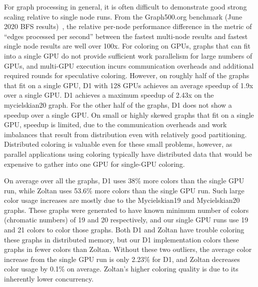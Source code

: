 For graph processing in general, it is often difficult to demonstrate good strong scaling relative to single node runs. From the Graph500.org benchmark (June 2020 BFS results)~\cite{graph500}, the relative per-node performance difference in the metric of ``edges processed per second'' between the fastest multi-node results and fastest single node results are well over 100x.
For coloring on GPUs, graphs that can fit into a single GPU do not provide sufficient work parallelism for large numbers of GPUs, and multi-GPU execution incurs communication overheads and additional required rounds for speculative coloring.
However, on roughly half of the graphs that fit on a single GPU, D1 with 128 GPUs achieves an average speedup of 1.9x over a single GPU.
D1 achieves a maximum speedup of 2.43x on the mycielskian20 graph.
For the other half of the graphs, D1 does not show a speedup over a single GPU.
On small or highly skewed graphs that fit on a single GPU, speedup is limited, due to the communication overheads and work imbalances that result from distribution even with relatively good partitioning.
Distributed coloring is valuable even for these small problems, however, as parallel applications 
using coloring typically have distributed data that would be expensive to gather into one GPU for single-GPU coloring.

On average over all the graphs, D1 uses 38\% more colors than the single GPU run, while Zoltan uses 53.6\% more colors than the single GPU run.
Such large color usage increases are mostly due to the Mycielskian19 and Mycielskian20 graphs.
These graphs were generated to have known minimum number of colors (chromatic numbers) of 19 and 20 respectively, and our single GPU runs use 19 and 21 colors to color those graphs.
Both D1 and Zoltan have trouble coloring these graphs in distributed memory, but our D1 implementation colors these graphs in fewer colors than Zoltan.
Without these two outliers, the average color increase from the single GPU run is only 2.23\% for D1, and Zoltan decreases color usage by 0.1\% on average.
Zoltan's higher coloring quality is due to its inherently lower concurrency.


